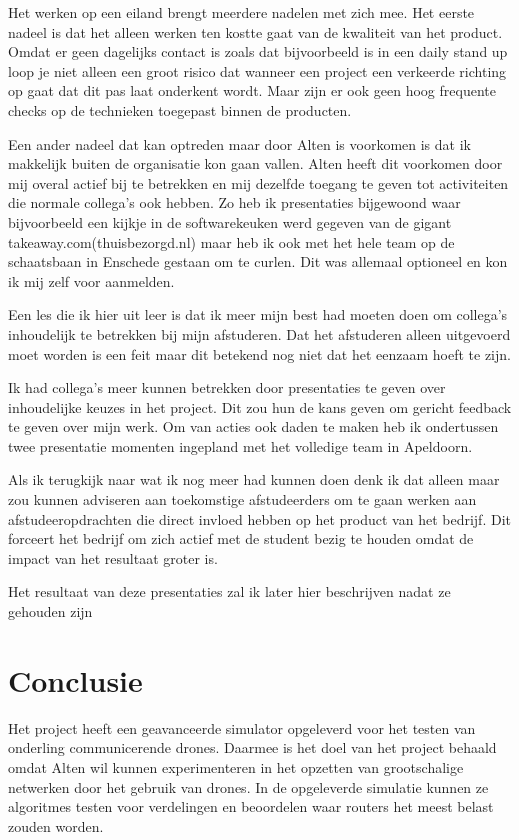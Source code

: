 \documentclass[a4paper, 11pt, oneside]{report}
\begin{document}
Het werken op een eiland brengt meerdere nadelen met zich mee.
Het eerste nadeel is dat het alleen werken ten kostte gaat van de kwaliteit van het product.
Omdat er geen dagelijks contact is zoals dat bijvoorbeeld is in een daily stand up loop je niet alleen een groot risico dat wanneer een project een verkeerde richting op gaat dat dit pas laat onderkent wordt. Maar zijn er ook geen hoog frequente checks op de technieken toegepast binnen de producten.

Een ander nadeel dat kan optreden maar door Alten is voorkomen is dat ik makkelijk buiten de organisatie kon gaan vallen.
Alten heeft dit voorkomen door mij overal actief bij te betrekken en mij dezelfde toegang te geven tot activiteiten die normale collega's ook hebben. Zo heb ik presentaties bijgewoond waar bijvoorbeeld een kijkje in de softwarekeuken werd gegeven van de gigant takeaway.com(thuisbezorgd.nl) maar heb ik ook met het hele team op de schaatsbaan in Enschede gestaan om te curlen. Dit was allemaal optioneel en kon ik mij zelf voor aanmelden.

Een les die ik hier uit leer is dat ik meer mijn best had moeten doen om collega's inhoudelijk te betrekken bij mijn afstuderen. Dat het afstuderen alleen uitgevoerd moet worden is een feit maar dit betekend nog niet dat het eenzaam hoeft te zijn.

Ik had collega's meer kunnen betrekken door presentaties te geven over inhoudelijke keuzes in het project. Dit zou hun de kans geven om gericht feedback te geven over mijn werk. Om van acties ook daden te maken heb ik ondertussen twee presentatie momenten ingepland met het volledige team in Apeldoorn.

Als ik terugkijk naar wat ik nog meer had kunnen doen denk ik dat alleen maar zou kunnen adviseren aan toekomstige afstudeerders om te gaan werken aan afstudeeropdrachten die direct invloed hebben op het product van het bedrijf. Dit forceert het bedrijf om zich actief met de student bezig te houden omdat de impact van het resultaat groter is. 

Het resultaat van deze presentaties zal ik later hier beschrijven nadat ze gehouden zijn


\chapter{Conclusie}\label{sec:conclusie}
Het project heeft een geavanceerde simulator opgeleverd voor het testen van onderling communicerende drones.
Daarmee is het doel van het project behaald omdat Alten wil kunnen experimenteren in het opzetten van grootschalige netwerken door het gebruik van drones.
In de opgeleverde simulatie kunnen ze algoritmes testen voor verdelingen en beoordelen waar routers het meest belast zouden worden.
\end{document}
